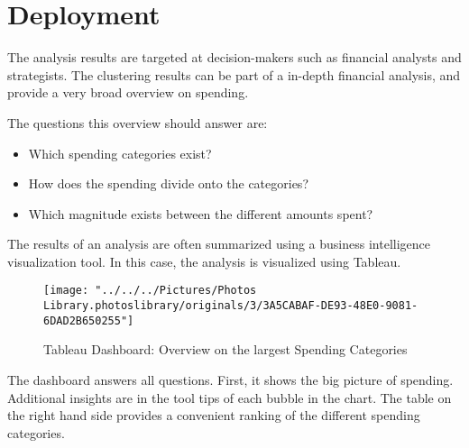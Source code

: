 
\chapter{Deployment}
	The analysis results are targeted at decision-makers such as financial analysts and strategists. The clustering results can be part of a in-depth financial analysis, and provide a very broad overview on spending.
	
	The questions this overview should answer are:
	\begin{itemize}
		\item Which spending categories exist?
		\item How does the spending divide onto the categories?
		\item Which magnitude exists between the different amounts spent?
	\end{itemize}
	
	The results of an analysis are often summarized using a business intelligence visualization tool. In this case, the analysis is visualized using Tableau.
	\begin{figure}[!h]
		\centering
		\texttt{[image: "../../../Pictures/Photos Library.photoslibrary/originals/3/3A5CABAF-DE93-48E0-9081-6DAD2B650255"]}
		\caption{Tableau Dashboard: Overview on the largest Spending Categories}
		\label{fig:dashboard}
	\end{figure}

	The dashboard answers all questions. First, it shows the big picture of spending. Additional insights are in the tool tips of each bubble in the chart. The table on the right hand side provides a convenient ranking of the different spending categories.
	
